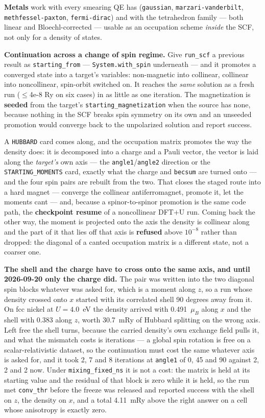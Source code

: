 \documentclass[11pt,a4paper]{article}
\newcommand{\code}[1]{\texttt{\small #1}}
\begin{document}
\textbf{Metals} work with every smearing QE has (\code{gaussian},
\code{marzari-vanderbilt}, \code{methfessel-paxton}, \code{fermi-dirac}) and
with the tetrahedron family --- both linear and Bloechl-corrected --- usable as
an occupation scheme \emph{inside} the SCF, not only for a density of states.

\textbf{Continuation across a change of spin regime.} Give \code{run\_scf} a
previous result as \code{starting\_from} --- \code{System.with\_spin}
underneath --- and it promotes a converged state into a
target's variables: non-magnetic into collinear, collinear into noncollinear,
spin-orbit switched on. It reaches the \emph{same} solution as a fresh run
($\le$4e-8 Ry on six cases) in as little as one iteration. The magnetization is
\textbf{seeded} from the target's \code{starting\_magnetization} when the source
has none, because nothing in the SCF breaks spin symmetry on its own and an
unseeded promotion would converge back to the unpolarized solution and report
success.

A \code{HUBBARD} card comes along, and the occupation matrix promotes the way
the density does: it is decomposed into a charge and a Pauli vector, the vector
is laid along the \emph{target's} own axis --- the \code{angle1}/\code{angle2}
direction or the \code{STARTING\_MOMENTS} card, exactly what the charge and
\code{becsum} are turned onto --- and the four spin pairs are rebuilt from the
two. That closes the staged route into a hard magnet --- converge the collinear
antiferromagnet, promote it, let the moments cant --- and, because a
spinor-to-spinor promotion is the same code path, the \textbf{checkpoint
resume} of a noncollinear DFT+U run. Coming back the other way, the moment is
projected onto the axis the density is collinear along and the part of it that
lies off that axis is \textbf{refused} above $10^{-8}$ rather than dropped: the
diagonal of a canted occupation matrix is a different state, not a coarser one.

\textbf{The shell and the charge have to cross onto the same axis, and until
2026-09-20 only the charge did.} The pair was written into the two diagonal spin
blocks whatever was asked for, which is a moment along $z$, so a run whose
density crossed onto $x$ started with its correlated shell 90 degrees away from
it. On fcc nickel at $U = 4.0$~eV the density arrived with 0.491~$\mu_B$ along
$x$ and the shell with 0.383 along $z$, worth 30.7~mRy of Hubbard splitting on
the wrong axis. Left free the shell turns, because the carried density's own
exchange field pulls it, and what the mismatch costs is iterations --- a global
spin rotation is free on a scalar-relativistic dataset, so the continuation must
cost the same whatever axis is asked for, and it took 2, 7 and 8 iterations at
\code{angle1} of 0, 45 and 90 against 2, 2 and 2 now. Under
\code{mixing\_fixed\_ns} it is not a cost: the matrix is held at its starting
value and the residual of that block is zero while it is held, so the run met
\code{conv\_thr} before the freeze was released and reported success with the
shell on $z$, the density on $x$, and a total 4.11~mRy above the right answer on
a cell whose anisotropy is exactly zero.
\end{document}
